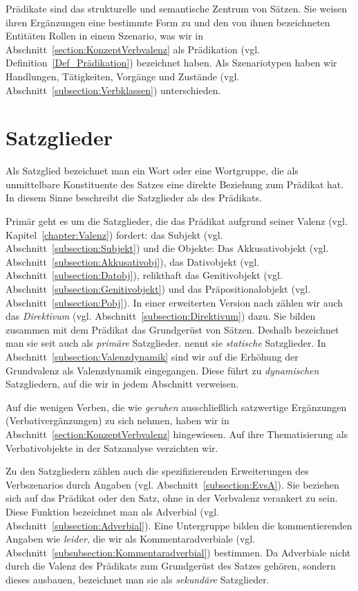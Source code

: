Prädikate sind das strukturelle und semantische Zentrum von Sätzen. Sie weisen ihren Ergänzungen eine bestimmte Form zu und den von ihnen bezeichneten Entitäten Rollen in einem Szenario, was wir in Abschnitt~\ref{section:KonzeptVerbvalenz} als Prädikation (vgl. Definition~\ref{Def_Prädikation}) bezeichnet haben. Als Szenariotypen haben wir Handlungen, Tätigkeiten, Vorgänge und Zustände (vgl. Abschnitt~\ref{subsection:Verbklassen}) unterschieden.


\section{Satzglieder}\label{section:Satzglieder}

Als Satzglied bezeichnet man ein Wort oder eine Wortgruppe, die als unmittelbare Konstituente des Satzes eine direkte Beziehung zum Prädikat hat. In diesem Sinne beschreibt \citet[80]{Engel2009} die Satzglieder als  des Prädikats. 

Primär geht es um die Satzglieder, die das Prädikat aufgrund seiner Valenz (vgl. Kapitel~\ref{chapter:Valenz}) fordert: das Subjekt (vgl. Abschnitt~\ref{subsection:Subjekt}) und die Objekte: Das Akkusativobjekt (vgl. Abschnitt~\ref{subsection:Akkusativobj}), das Dativobjekt (vgl. Abschnitt~\ref{subsection:Datobj}), relikthaft das Genitivobjekt (vgl. Abschnitt~\ref{subsection:Genitivobjekt}) und das Präpositionalobjekt (vgl. Abschnitt~\ref{subsection:Pobj}). In einer erweiterten Version nach \citet[1]{Welke2007} zählen wir auch das \textit{Direktivum} (vgl. Abschnitt~\ref{subsection:Direktivum}) dazu. Sie bilden zusammen mit dem Prädikat das Grundgerüst von Sätzen. Deshalb bezeichnet man sie seit \citet[92--93]{Helbig1978sekSG} auch als \textit{primäre} Satzglieder. \citet[47]{Agel2017} nennt sie \textit{statische} Satzglieder. In Abschnitt~\ref{subsection:Valenzdynamik} sind wir auf die Erhöhung der Grundvalenz als Valenzdynamik eingegangen. Diese führt zu \textit{dynamischen} Satzgliedern, auf die wir in jedem Abschnitt verweisen.

Auf die wenigen Verben, die wie \textit{geruhen} ausschließlich satzwertige Ergänzungen (Verbativergänzungen) zu sich nehmen, haben wir in Abschnitt~\ref{section:KonzeptVerbvalenz} hingewiesen. Auf ihre Thematisierung als Verbativobjekte in der Satzanalyse verzichten wir.  
      

Zu den Satzgliedern zählen auch die spezifizierenden Erweiterungen des Verbszenarios durch Angaben (vgl. Abschnitt~\ref{subsection:EvsA}). Sie beziehen sich auf das Prädikat oder den Satz, ohne in der Verbvalenz verankert zu sein. Diese Funktion bezeichnet man als Adverbial (vgl. Abschnitt~\ref{subsection:Adverbial}). Eine Untergruppe bilden die kommentierenden Angaben wie \textit{leider}, die wir als Kommentaradverbiale (vgl. Abschnitt~\ref{subsubsection:Kommentaradverbial}) bestimmen. Da Adverbiale nicht durch die Valenz des Prädikats zum Grundgerüst des Satzes gehören, sondern dieses ausbauen, bezeichnet man sie als \textit{sekundäre} Satzglieder.  

